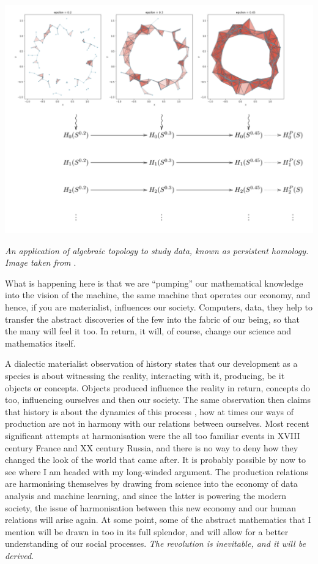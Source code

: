 \documentclass{article}
\begin{document}
\begin{center}
\includegraphics[scale=0.5]{noisy_circle_simplexes_and_persistent_homology.png}

\textit{An application of algebraic topology to study data, known as persistent homology. Image taken from \cite{BUNCH}}.
\end{center}


What is happening here is that we are “pumping” our mathematical knowledge into the vision of the machine, the same machine that operates our economy, and hence, if you are materialist, influences our society. Computers, data, they help to transfer the abstract discoveries of the few into the fabric of our being, so that the many will feel it too. In return, it will, of course, change our science and mathematics itself.

A dialectic materialist observation of history states that our development as a species is about witnessing the reality, interacting with it, producing, be it objects or concepts. Objects produced influence the reality in return, concepts do too, influencing ourselves and then our society. The same observation then claims that history is about the dynamics of this process  \cite{MARX,MARXENGCPE}, how at times our ways of production are not in harmony with our relations between ourselves. Most recent significant attempts at harmonisation were the all too familiar events in XVIII century France and XX century Russia, and there is no way to deny how they changed the look of the world that came after. It is probably possible by now to see where I am headed with my long-winded argument. The production relations are harmonising themselves by drawing from science into the economy of data analysis and machine learning, and since the latter is powering the modern society, the issue of harmonisation between this new economy and our human relations will arise again. At some point, some of the abstract mathematics that I mention will be drawn in too in its full splendor, and will allow for a better understanding of our social processes. \emph{The revolution is inevitable, and it will be derived.}
\end{document}
